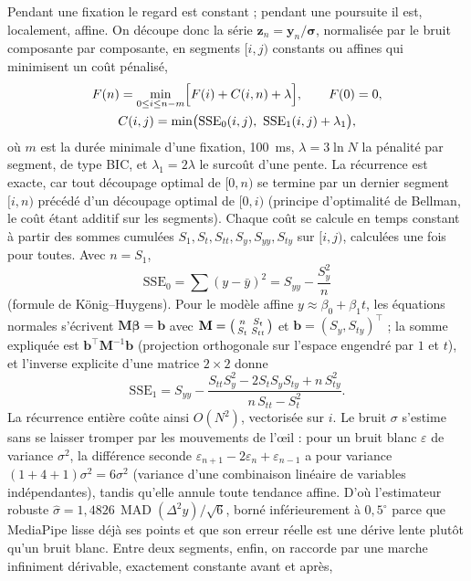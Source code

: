 \documentclass[10pt,a4paper]{article}
\newcommand{\vect}[1]{\symbf{#1}}
\newcommand{\T}{^{\top}}
\DeclareMathOperator{\MAD}{MAD}
\begin{document}
Pendant une fixation le regard est constant ; pendant une poursuite il est, localement, affine. On découpe donc la série $\vect z_n=\vect y_n/\vect\sigma$, normalisée par le bruit composante par composante, en segments $[i,j)$ constants ou affines qui minimisent un coût pénalisé,
\begin{equation}
\begin{gathered}
F(n)=\min_{0\le i\le n-m}\Bigl[F(i)+C(i,n)+\lambda\Bigr],\qquad F(0)=0,\\
C(i,j)=\min\bigl(\mathrm{SSE}_0(i,j),\ \mathrm{SSE}_1(i,j)+\lambda_1\bigr),
\end{gathered}
\end{equation}
où $m$ est la durée minimale d'une fixation, 100~ms, $\lambda=3\ln N$ la pénalité par segment, de type BIC, et $\lambda_1=2\lambda$ le surcoût d'une pente. La récurrence est exacte, car tout découpage optimal de $[0,n)$ se termine par un dernier segment $[i,n)$ précédé d'un découpage optimal de $[0,i)$ (principe d'optimalité de Bellman, le coût étant additif sur les segments). Chaque coût se calcule en temps constant à partir des sommes cumulées $S_1,S_t,S_{tt},S_y,S_{yy},S_{ty}$ sur $[i,j)$, calculées une fois pour toutes. Avec $n=S_1$,
\begin{equation}
\mathrm{SSE}_0=\sum(y-\bar y)^2=S_{yy}-\frac{S_y^2}{n}
\end{equation}
(formule de König--Huygens). Pour le modèle affine $y\approx\beta_0+\beta_1t$, les équations normales s'écrivent $\mathbf M\vect\beta=\vect b$ avec $\mathbf M=\begin{psmallmatrix}n&S_t\\S_t&S_{tt}\end{psmallmatrix}$ et $\vect b=(S_y,S_{ty})\T$ ; la somme expliquée est $\vect b\T\mathbf M^{-1}\vect b$ (projection orthogonale sur l'espace engendré par $1$ et $t$), et l'inverse explicite d'une matrice $2\times2$ donne
\begin{equation}
\mathrm{SSE}_1=S_{yy}-\frac{S_{tt}S_y^2-2S_tS_yS_{ty}+n\,S_{ty}^2}{n\,S_{tt}-S_t^2}.
\end{equation}
La récurrence entière coûte ainsi $O(N^2)$, vectorisée sur $i$. Le bruit $\sigma$ s'estime sans se laisser tromper par les mouvements de l'œil : pour un bruit blanc $\varepsilon$ de variance $\sigma^2$, la différence seconde $\varepsilon_{n+1}-2\varepsilon_n+\varepsilon_{n-1}$ a pour variance $(1+4+1)\sigma^2=6\sigma^2$ (variance d'une combinaison linéaire de variables indépendantes), tandis qu'elle annule toute tendance affine. D'où l'estimateur robuste $\hat\sigma=1{,}4826\,\MAD(\Delta^2y)/\sqrt6$, borné inférieurement à $0{,}5^\circ$ parce que MediaPipe lisse déjà ses points et que son erreur réelle est une dérive lente plutôt qu'un bruit blanc. Entre deux segments, enfin, on raccorde par une marche infiniment dérivable, exactement constante avant et après,
\end{document}
